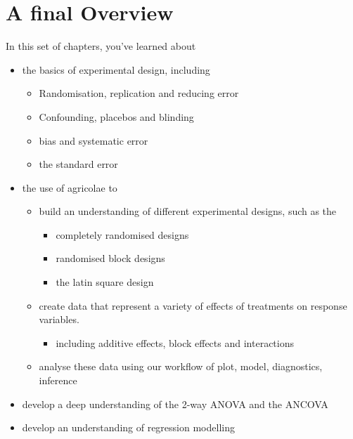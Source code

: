 \documentclass[
]{book}
\providecommand{\tightlist}{%
  \setlength{\itemsep}{0pt}\setlength{\parskip}{0pt}}
\begin{document}
\hypertarget{a-final-overview}{%
\chapter{A final Overview}\label{a-final-overview}}

In this set of chapters, you've learned about

\begin{itemize}
\tightlist
\item
  the basics of experimental design, including

  \begin{itemize}
  \tightlist
  \item
    Randomisation, replication and reducing error
  \item
    Confounding, placebos and blinding
  \item
    bias and systematic error
  \item
    the standard error
  \end{itemize}
\item
  the use of agricolae to

  \begin{itemize}
  \tightlist
  \item
    build an understanding of different experimental designs, such as the

    \begin{itemize}
    \tightlist
    \item
      completely randomised designs
    \item
      randomised block designs
    \item
      the latin square design
    \end{itemize}
  \item
    create data that represent a variety of effects of treatments on response variables.

    \begin{itemize}
    \tightlist
    \item
      including additive effects, block effects and interactions
    \end{itemize}
  \item
    analyse these data using our workflow of plot, model, diagnostics, inference
  \end{itemize}
\item
  develop a deep understanding of the 2-way ANOVA and the ANCOVA
\item
  develop an understanding of regression modelling
\end{itemize}
\end{document}
